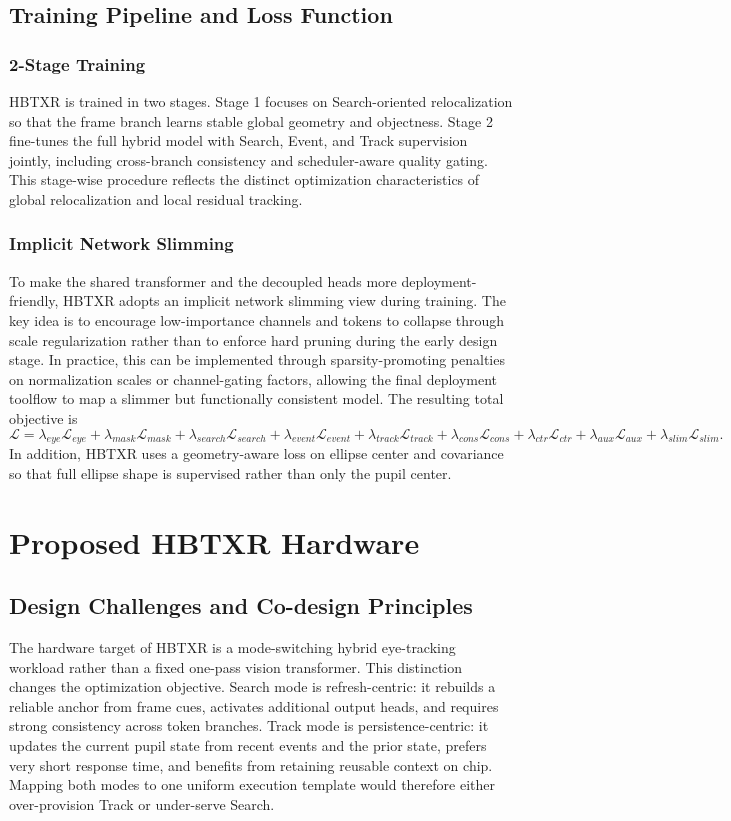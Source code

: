 \documentclass[journal]{IEEEtran}
\begin{document}
\subsection{Training Pipeline and Loss Function}
\subsubsection{2-Stage Training}
HBTXR is trained in two stages. Stage 1 focuses on Search-oriented relocalization so that the frame branch learns stable global geometry and objectness. Stage 2 fine-tunes the full hybrid model with Search, Event, and Track supervision jointly, including cross-branch consistency and scheduler-aware quality gating. This stage-wise procedure reflects the distinct optimization characteristics of global relocalization and local residual tracking.

\subsubsection{Implicit Network Slimming}
To make the shared transformer and the decoupled heads more deployment-friendly, HBTXR adopts an implicit network slimming view during training. The key idea is to encourage low-importance channels and tokens to collapse through scale regularization rather than to enforce hard pruning during the early design stage. In practice, this can be implemented through sparsity-promoting penalties on normalization scales or channel-gating factors, allowing the final deployment toolflow to map a slimmer but functionally consistent model. The resulting total objective is
\begin{equation}
\mathcal{L}=\lambda_{eye}\mathcal{L}_{eye}+\lambda_{mask}\mathcal{L}_{mask}+\lambda_{search}\mathcal{L}_{search}+\lambda_{event}\mathcal{L}_{event}+\lambda_{track}\mathcal{L}_{track}+\lambda_{cons}\mathcal{L}_{cons}+\lambda_{ctr}\mathcal{L}_{ctr}+\lambda_{aux}\mathcal{L}_{aux}+\lambda_{slim}\mathcal{L}_{slim}.
\end{equation}
In addition, HBTXR uses a geometry-aware loss on ellipse center and covariance so that full ellipse shape is supervised rather than only the pupil center.


\section{Proposed HBTXR Hardware}
\subsection{Design Challenges and Co-design Principles}
The hardware target of HBTXR is a mode-switching hybrid eye-tracking workload rather than a fixed one-pass vision transformer. This distinction changes the optimization objective. Search mode is refresh-centric: it rebuilds a reliable anchor from frame cues, activates additional output heads, and requires strong consistency across token branches. Track mode is persistence-centric: it updates the current pupil state from recent events and the prior state, prefers very short response time, and benefits from retaining reusable context on chip. Mapping both modes to one uniform execution template would therefore either over-provision Track or under-serve Search.
\end{document}
